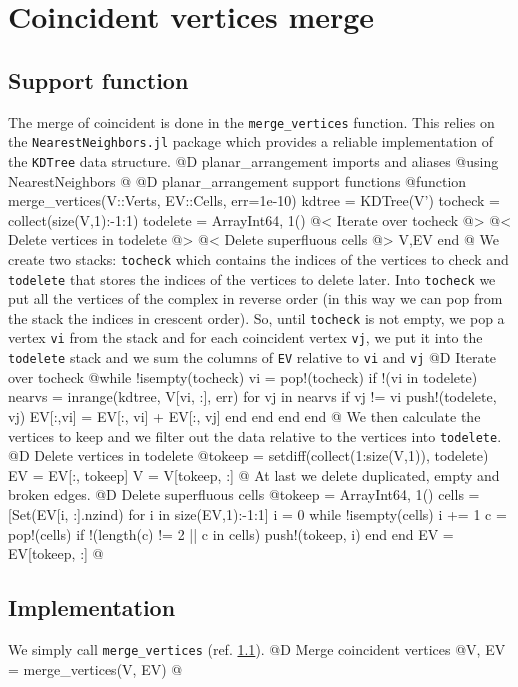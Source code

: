 \documentclass[10pt]{book}
\begin{document}
\section{Coincident vertices merge}
\subsection{Support function}
\label{sec:merge_vertices}
The merge of coincident is done in the \texttt{merge\_vertices}
function. This relies on the \texttt{NearestNeighbors.jl} package\cite{NearestNeighbors}
which provides a reliable implementation of the \texttt{KDTree} data structure.
@D planar\_arrangement imports and aliases
@{using NearestNeighbors
@}
@D planar\_arrangement support functions
@{function merge_vertices(V::Verts, EV::Cells, err=1e-10)
    kdtree = KDTree(V')
    tocheck = collect(size(V,1):-1:1)
    todelete = Array{Int64, 1}()
    @< Iterate over tocheck @>
    @< Delete vertices in todelete @>
    @< Delete superfluous cells @>
    V,EV
end
@}
We create two stacks: \texttt{tocheck} which contains the indices of the vertices
to check and \texttt{todelete} that stores the indices of the vertices to delete later.
Into \texttt{tocheck} we put all the vertices of the complex in reverse order (in
this way we can pop from the stack the indices in crescent order). So, until \texttt{tocheck} is not empty,
we pop a vertex \texttt{vi} from the stack and for each coincident vertex \texttt{vj}, we put it 
into the \texttt{todelete} stack and we sum the columns of \texttt{EV} relative to \texttt{vi} and \texttt{vj}
@D Iterate over tocheck 
@{while !isempty(tocheck)
    vi = pop!(tocheck)
    if !(vi in todelete)
        nearvs = inrange(kdtree, V[vi, :], err)
        for vj in nearvs
            if vj != vi
                push!(todelete, vj)
                EV[:,vi] = EV[:, vi] + EV[:, vj]
            end
        end
    end
end
@}
We then calculate the vertices to keep and we filter out
the data relative to the vertices into \texttt{todelete}.
@D Delete vertices in todelete
@{tokeep = setdiff(collect(1:size(V,1)), todelete)
EV = EV[:, tokeep]
V = V[tokeep, :]
@}
At last we delete duplicated, empty and broken edges.
@D Delete superfluous cells
@{tokeep = Array{Int64, 1}()
cells = [Set(EV[i, :].nzind) for i in size(EV,1):-1:1]
i = 0
while !isempty(cells)
    i += 1
    c = pop!(cells)
    if !(length(c) != 2 || c in cells)
        push!(tokeep, i)
    end
end
EV = EV[tokeep, :]
@}
\subsection{Implementation}
We simply call \texttt{merge\_vertices} (ref. \ref{sec:merge_vertices}).
@D Merge coincident vertices
@{V, EV = merge_vertices(V, EV)
@}
\end{document}
